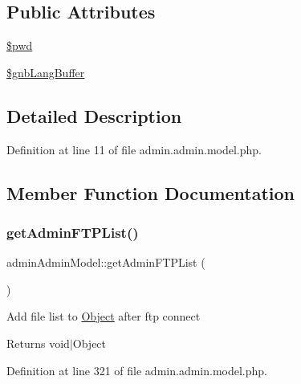 \subsection*{Public Attributes}
\begin{DoxyCompactItemize}
\item 
\hyperlink{classadminAdminModel_a0c3f3a9ef22f7f5b6ed159a11d8d8e45}{\$pwd}
\item 
\hyperlink{classadminAdminModel_acd5e0dd59b6eb5c0df5638247797c799}{\$gnb\+Lang\+Buffer}
\end{DoxyCompactItemize}


\subsection{Detailed Description}


Definition at line 11 of file admin.\+admin.\+model.\+php.



\subsection{Member Function Documentation}
\mbox{\label{classadminAdminModel_a9e944aba1586e011811993745738728e}} 
\subsubsection{\texorpdfstring{get\+Admin\+F\+T\+P\+List()}{getAdminFTPList()}}
{\footnotesize\ttfamily admin\+Admin\+Model\+::get\+Admin\+F\+T\+P\+List (\begin{DoxyParamCaption}{ }\end{DoxyParamCaption})}

Add file list to \hyperlink{classObject}{Object} after ftp connect \begin{DoxyReturn}{Returns}
void$\vert$\+Object 
\end{DoxyReturn}


Definition at line 321 of file admin.\+admin.\+model.\+php.

\mbox{\label{classadminAdminModel_a155e29f18f17c6c657a457fcd65fd24b}} 
